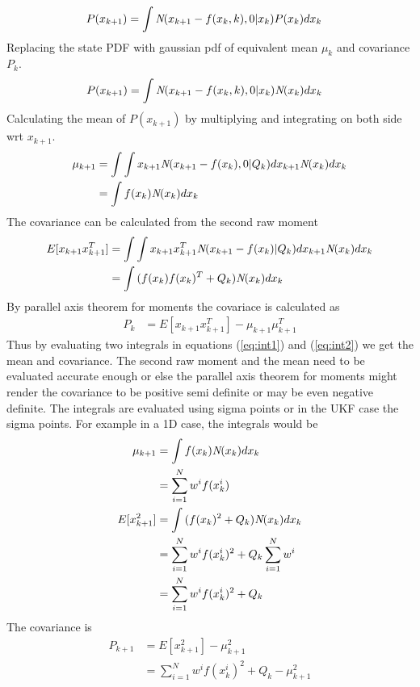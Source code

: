 \documentclass{article}
\begin{document}
\begin{align}
	P(x_{k+1})&=\int{{\bf\emph{N}}(x_{k+1}-f(x_k,k),0|x_k)P(x_k)}dx_k
	\end{align}
		Replacing the state PDF with gaussian pdf of equivalent mean $\mu_k$ and covariance $P_k$. 
		\begin{align}
	P(x_{k+1})&=\int{{\bf\emph{N}}(x_{k+1}-f(x_k,k),0|x_k){\bf\emph{N}}(x_k)}dx_k
	\end{align}
	Calculating the mean of $P(x_{k+1})$ by multiplying and integrating on both side wrt $x_{k+1}$.
		\begin{align}
	\mu_{k+1}&=\int{\int{x_{k+1}{\bf\emph{N}}(x_{k+1}-f(x_k),0|Q_k)}dx_{k+1}{\bf\emph{N}}(x_k)}dx_k\\
	&=\int{f(x_k){\bf\emph{N}}(x_k)}dx_k \label{eq:int1}
	\end{align}
The covariance can be calculated from the second raw moment
			\begin{align}	E[x_{k+1}x_{k+1}^T]&=\int{\int{x_{k+1}x_{k+1}^T{\bf\emph{N}}(x_{k+1}-f(x_k)|Q_k)}dx_{k+1}{\bf\emph{N}}(x_k)}dx_k\\
	&=\int{(f(x_k)f(x_k)^T+Q_k){\bf\emph{N}}(x_k)}dx_k \label{eq:int2}
	\end{align}
	By parallel axis theorem for moments the covariace is calculated as
	\begin{align}
	P_k&=E[x_{k+1}x_{k+1}^T]-\mu_{k+1}\mu_{k+1}^T
	\end{align}
	Thus by evaluating two integrals in equations (\ref{eq:int1}) and (\ref{eq:int2}) we get the mean and covariance. The second raw moment and the mean need to be evaluated accurate enough or else the parallel axis theorem for moments might render the covariance to be positive semi definite or may be even negative definite. The integrals are evaluated using sigma points or in the UKF case the sigma points. For example in a 1D case, the integrals would be
	 \begin{align}
	 \mu_{k+1}&=\int{f(x_k){\bf\emph{N}}(x_k)}dx_k\\
	 &=\sum_{i=1}^{N}w^if(x_k^i) \label{eq:mean1}\\
	E[x_{k+1}^2]&=\int{(f(x_k)^2+Q_k){\bf\emph{N}}(x_k)}dx_k\\
	&=\sum_{i=1}^{N}w^if(x_k^i)^2+Q_k\sum_{i=1}^{N}w^i\\
	&=\sum_{i=1}^{N}w^if(x_k^i)^2+Q_k
	\end{align}
	The covariance is
	\begin{align}
	P_{k+1}&=E[x_{k+1}^2]-\mu_{k+1}^2\\
	   &=\sum_{i=1}^{N}w^if(x_k^i)^2+Q_k-\mu_{k+1}^2 \label{eq:cov1}
	\end{align}
\end{document}
